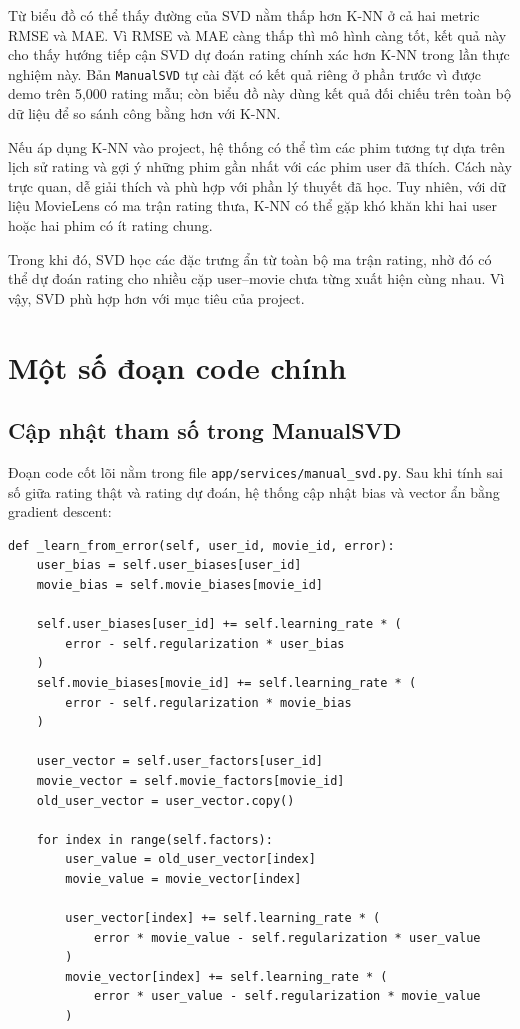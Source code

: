 \documentclass[12pt,a4paper]{article}
\begin{document}
Từ biểu đồ có thể thấy đường của SVD nằm thấp hơn K-NN ở cả hai metric RMSE và MAE. Vì RMSE và MAE càng thấp thì mô hình càng tốt, kết quả này cho thấy hướng tiếp cận SVD dự đoán rating chính xác hơn K-NN trong lần thực nghiệm này. Bản \texttt{ManualSVD} tự cài đặt có kết quả riêng ở phần trước vì được demo trên 5,000 rating mẫu; còn biểu đồ này dùng kết quả đối chiếu trên toàn bộ dữ liệu để so sánh công bằng hơn với K-NN.

Nếu áp dụng K-NN vào project, hệ thống có thể tìm các phim tương tự dựa trên lịch sử rating và gợi ý những phim gần nhất với các phim user đã thích. Cách này trực quan, dễ giải thích và phù hợp với phần lý thuyết đã học. Tuy nhiên, với dữ liệu MovieLens có ma trận rating thưa, K-NN có thể gặp khó khăn khi hai user hoặc hai phim có ít rating chung.

Trong khi đó, SVD học các đặc trưng ẩn từ toàn bộ ma trận rating, nhờ đó có thể dự đoán rating cho nhiều cặp user--movie chưa từng xuất hiện cùng nhau. Vì vậy, SVD phù hợp hơn với mục tiêu của project.

\section{Một số đoạn code chính}

\subsection{Cập nhật tham số trong ManualSVD}

Đoạn code cốt lõi nằm trong file \texttt{app/services/manual\_svd.py}. Sau khi tính sai số giữa rating thật và rating dự đoán, hệ thống cập nhật bias và vector ẩn bằng gradient descent:

\begin{lstlisting}[style=pythonstyle]
def _learn_from_error(self, user_id, movie_id, error):
    user_bias = self.user_biases[user_id]
    movie_bias = self.movie_biases[movie_id]

    self.user_biases[user_id] += self.learning_rate * (
        error - self.regularization * user_bias
    )
    self.movie_biases[movie_id] += self.learning_rate * (
        error - self.regularization * movie_bias
    )

    user_vector = self.user_factors[user_id]
    movie_vector = self.movie_factors[movie_id]
    old_user_vector = user_vector.copy()

    for index in range(self.factors):
        user_value = old_user_vector[index]
        movie_value = movie_vector[index]

        user_vector[index] += self.learning_rate * (
            error * movie_value - self.regularization * user_value
        )
        movie_vector[index] += self.learning_rate * (
            error * user_value - self.regularization * movie_value
        )
\end{lstlisting}
\end{document}
